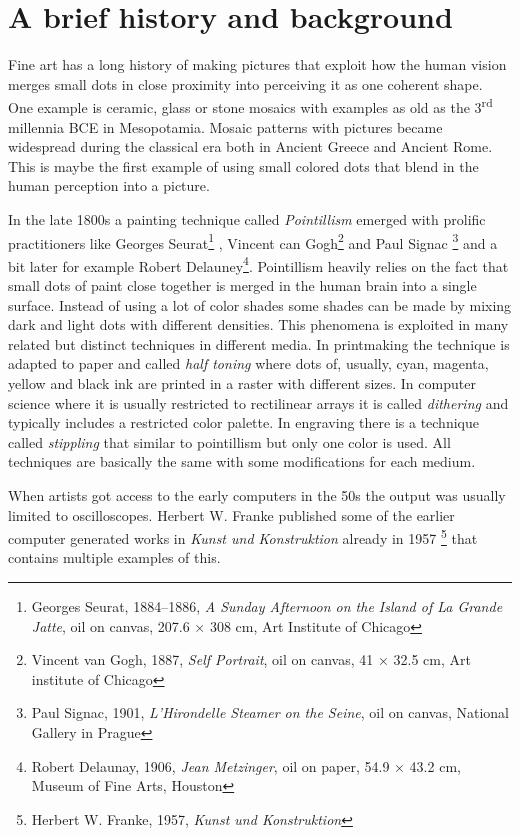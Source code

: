 \documentclass{article}
\begin{document}
\section{A brief history and background}
Fine art has a long history of making pictures that exploit how the
human vision merges small dots in close proximity into perceiving it as
one coherent shape. One example is ceramic, glass or stone mosaics with
examples as old as the 3\textsuperscript{rd} millennia BCE in
Mesopotamia. Mosaic patterns with pictures became widespread during the
classical era both in Ancient Greece and Ancient Rome. This is maybe the
first example of using small colored dots that blend in the human
perception into a picture.

In the late 1800s a painting technique called \emph{Pointillism} emerged
with prolific practitioners like Georges Seurat\footnote{Georges Seurat,
  1884--1886, \emph{A Sunday Afternoon on the Island of La Grande
  Jatte}, oil on canvas, 207.6 × 308 cm, Art Institute of Chicago} ,
Vincent can Gogh\footnote{Vincent van Gogh, 1887, \emph{Self Portrait},
  oil on canvas, 41 × 32.5 cm, Art institute of Chicago} and Paul Signac
\footnote{Paul Signac, 1901, \emph{L'Hirondelle Steamer on the Seine},
  oil on canvas, National Gallery in Prague} and a bit later for example
Robert Delauney\footnote{Robert Delaunay, 1906, \emph{Jean Metzinger},
  oil on paper, 54.9 × 43.2 cm, Museum of Fine Arts, Houston}.
Pointillism heavily relies on the fact that small dots of paint close
together is merged in the human brain into a single surface. Instead of
using a lot of color shades some shades can be made by mixing dark and
light dots with different densities. This phenomena is exploited in many
related but distinct techniques in different media. In printmaking the
technique is adapted to paper and called \emph{half toning} where dots
of, usually, cyan, magenta, yellow and black ink are printed in a raster
with different sizes. In computer science where it is usually restricted
to rectilinear arrays it is called \emph{dithering} and typically includes
a restricted color palette. In engraving there is a technique called
\emph{stippling} that similar to pointillism but only one color is
used. All techniques are basically the same with some modifications for
each medium.

When artists got access to the early computers in the 50s the output was
usually limited to oscilloscopes. Herbert W. Franke published some of the earlier
computer generated works in \emph{Kunst und Konstruktion} already in 1957 \footnote{Herbert W. Franke, 1957, \emph{Kunst und Konstruktion}}
that contains multiple examples of this.
\end{document}
